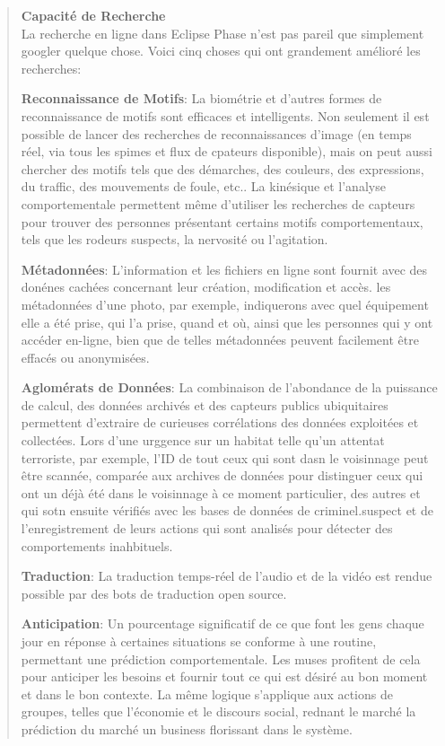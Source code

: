 \begin{quotation} \textbf{Capacité de Recherche} \\ La recherche en ligne dans Eclipse Phase n'est pas pareil que simplement googler quelque chose. Voici cinq choses qui ont grandement amélioré les recherches: 

\textbf{Reconnaissance de Motifs}: La biométrie et d'autres formes de reconnaissance de motifs sont efficaces et intelligents. Non seulement il est possible de lancer des recherches de reconnaissances d'image (en temps réel, via tous les spimes et flux de cpateurs disponible), mais on peut aussi chercher des motifs tels que des démarches, des couleurs, des expressions, du traffic, des mouvements de foule, etc.. La kinésique et l'analyse comportementale permettent même d'utiliser les recherches de capteurs pour trouver des personnes présentant certains motifs comportementaux, tels que les rodeurs suspects, la nervosité ou l'agitation. 

\textbf{Métadonnées}: L'information et les fichiers en ligne sont fournit avec des donénes cachées concernant leur création, modification et accès. les métadonnées d'une photo, par exemple, indiquerons avec quel équipement elle a été prise, qui l'a prise, quand et où, ainsi que les personnes qui y ont accéder en-ligne, bien que de telles métadonnées peuvent facilement être effacés ou anonymisées. 

\textbf{Aglomérats de Données}: La combinaison de l'abondance de la puissance de calcul, des données archivés et des capteurs publics ubiquitaires permettent d'extraire de curieuses corrélations des données exploitées et collectées. Lors d'une urggence sur un habitat telle qu'un attentat terroriste, par exemple, l'ID de tout ceux qui sont dasn le voisinnage peut être scannée, comparée aux archives de données pour distinguer ceux qui ont un déjà été dans le voisinnage à ce moment particulier, des autres et qui sotn ensuite vérifiés avec les bases de données de criminel.suspect et de l'enregistrement de leurs actions qui sont analisés pour détecter des comportements inahbituels. 

\textbf{Traduction}: La traduction temps-réel de l'audio et de la vidéo est rendue possible par des bots de traduction open source. 

\textbf{Anticipation}: Un pourcentage significatif de ce que font les gens chaque jour en réponse à certaines situations se conforme à une routine, permettant une prédiction comportementale. Les muses profitent de cela pour anticiper les besoins et fournir tout ce qui est désiré au bon moment et dans le bon contexte. La même logique s'applique aux actions de groupes, telles que l'économie et le discours social, rednant le marché la prédiction du marché un business florissant dans le système. \end{quotation} 

